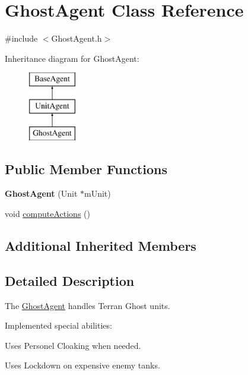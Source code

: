 \hypertarget{class_ghost_agent}{\section{Ghost\-Agent Class Reference}
\label{class_ghost_agent}
}


{\ttfamily \#include $<$Ghost\-Agent.\-h$>$}

Inheritance diagram for Ghost\-Agent\-:\begin{figure}[H]
\begin{center}
\leavevmode
\includegraphics[height=3.000000cm]{class_ghost_agent}
\end{center}
\end{figure}
\subsection*{Public Member Functions}
\begin{DoxyCompactItemize}
\item 
\hypertarget{class_ghost_agent_a81540d92bc2222c11da85f33ee65dd07}{{\bfseries Ghost\-Agent} (Unit $\ast$m\-Unit)}\label{class_ghost_agent_a81540d92bc2222c11da85f33ee65dd07}

\item 
void \hyperlink{class_ghost_agent_a31600d696462cf1ab683fe8653ce5514}{compute\-Actions} ()
\end{DoxyCompactItemize}
\subsection*{Additional Inherited Members}


\subsection{Detailed Description}
The \hyperlink{class_ghost_agent}{Ghost\-Agent} handles Terran Ghost units.

Implemented special abilities\-:
\begin{DoxyItemize}
\item Uses Personel Cloaking when needed.
\item Uses Lockdown on expensive enemy tanks.
\end{DoxyItemize}

